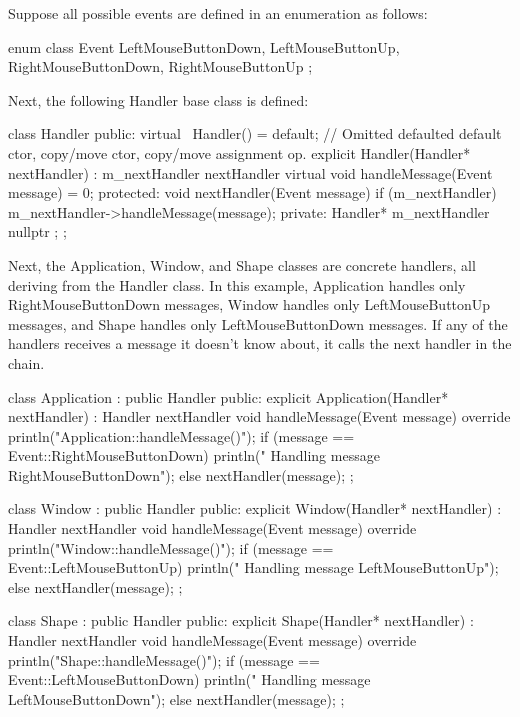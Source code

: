 Suppose all possible events are defined in an enumeration as follows:

\begin{cpp}
enum class Event { LeftMouseButtonDown, LeftMouseButtonUp,
    RightMouseButtonDown, RightMouseButtonUp };
\end{cpp}

Next, the following Handler base class is defined:

\begin{cpp}
class Handler
{
    public:
        virtual ~Handler() = default;
        // Omitted defaulted default ctor, copy/move ctor, copy/move assignment op.
        explicit Handler(Handler* nextHandler) : m_nextHandler { nextHandler } { }
        virtual void handleMessage(Event message) = 0;
    protected:
        void nextHandler(Event message)
        {
            if (m_nextHandler) { m_nextHandler->handleMessage(message); }
        }
    private:
        Handler* m_nextHandler { nullptr };
};
\end{cpp}

Next, the Application, Window, and Shape classes are concrete handlers, all deriving from the Handler class. In this example, Application handles only RightMouseButtonDown messages, Window handles only LeftMouseButtonUp messages, and Shape handles only LeftMouseButtonDown messages. If any of the handlers receives a message it doesn’t know about, it calls the next handler in the chain.

\begin{cpp}
class Application : public Handler
{
    public:
        explicit Application(Handler* nextHandler) : Handler { nextHandler } { }
        void handleMessage(Event message) override
        {
            println("Application::handleMessage()");
            if (message == Event::RightMouseButtonDown) {
                println(" Handling message RightMouseButtonDown");
            } else { nextHandler(message); }
        }
};

class Window : public Handler
{
    public:
        explicit Window(Handler* nextHandler) : Handler { nextHandler } { }
        void handleMessage(Event message) override
        {
            println("Window::handleMessage()");
            if (message == Event::LeftMouseButtonUp) {
                println(" Handling message LeftMouseButtonUp");
            } else { nextHandler(message); }
        }
};

class Shape : public Handler
{
    public:
        explicit Shape(Handler* nextHandler) : Handler { nextHandler } { }
        void handleMessage(Event message) override
        {
            println("Shape::handleMessage()");
            if (message == Event::LeftMouseButtonDown) {
                println(" Handling message LeftMouseButtonDown");
            } else { nextHandler(message); }
        }
};
\end{cpp}

